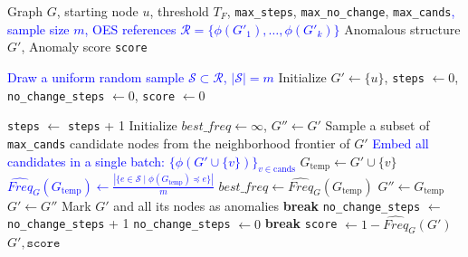 \documentclass[preprint,12pt]{elsarticle}
\newcommand{\new}[1]{\textcolor{blue}{#1}}
\theoremstyle{plain}
\theoremstyle{definition}
\theoremstyle{remark}
\begin{document}
\begin{algorithm}[htbp]
\caption{Greedy Search for Anomalous Structures}
\label{algo:algo}
\scriptsize
\begin{algorithmic}[1]
\Require Graph $G$, starting node $u$, threshold $T_F$, \texttt{max\_steps}, \texttt{max\_no\_change}, \texttt{max\_cands}\new{, sample size $m$, OES references $\mathcal{R} = \{\phi(G'_1), \dots, \phi(G'_k)\}$}
\Ensure Anomalous structure $G'$, Anomaly score \texttt{score}

\State \new{Draw a uniform random sample $\mathcal{S} \subset \mathcal{R}$, $|\mathcal{S}| = m$} \label{line:ref_sample}
\State Initialize $G' \gets \{u\}$, \texttt{steps} $\gets 0$, \texttt{no\_change\_steps} $\gets 0$, \texttt{score} $\gets 0$

    \State \texttt{steps} $\gets$ \texttt{steps} + 1
    \State Initialize $best\_freq \gets \infty$, $G'' \gets G'$
    \State Sample a subset of \texttt{max\_cands} candidate nodes from the neighborhood frontier of $G'$ \label{line:sampling}
    \State \new{Embed all candidates in a single batch: $\{\phi(G' \cup \{v\})\}_{v \in \text{cands}}$} \label{line:batch_embed}
        \State $G_{\text{temp}} \gets G' \cup \{v\}$
        \State \new{$\widehat{Freq}_G(G_{\text{temp}}) \gets \frac{|\{e \in \mathcal{S} \mid \phi(G_{\text{temp}}) \preceq e\}|}{m}$} \label{line:sampled_freq}
            \State $best\_freq \gets \widehat{Freq}_G(G_{\text{temp}})$
            \State $G'' \gets G_{\text{temp}}$
        \EndIf
    \EndFor
    \State $G' \gets G''$
        \State Mark $G'$ and all its nodes as anomalies
        \State \textbf{break}
    \EndIf
        \State \texttt{no\_change\_steps} $\gets$ \texttt{no\_change\_steps} + 1
    \Else
        \State \texttt{no\_change\_steps} $\gets 0$
    \EndIf
        \State \textbf{break}
    \EndIf
\EndWhile
\State \texttt{score} $\gets 1 - \widehat{Freq}_G(G')$
\Return $G', \texttt{score}$
\end{algorithmic}
\end{algorithm}

\smallskip
{}
\end{document}
